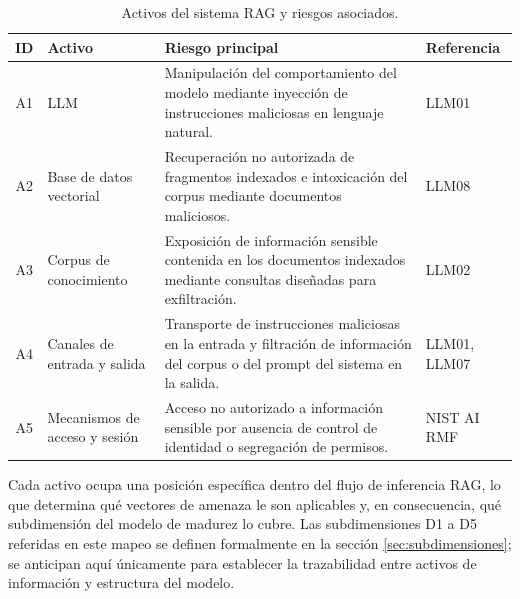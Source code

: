 \begin{table}[H]
\centering
\caption{Activos del sistema RAG y riesgos asociados.}
\label{tab:activos}
\begin{tabularx}{\textwidth}{@{} c >{\hsize=0.85\hsize\raggedright\arraybackslash}X >{\hsize=1.45\hsize\raggedright\arraybackslash}X >{\hsize=0.70\hsize\raggedright\arraybackslash}X @{}}
  \toprule
  \textbf{ID} & \textbf{Activo} & \textbf{Riesgo principal} & \textbf{Referencia} \\
  \midrule
  A1 & LLM &
    Manipulación del comportamiento del modelo mediante inyección de instrucciones maliciosas en lenguaje natural. &
    LLM01 \\
  A2 & Base de datos vectorial &
    Recuperación no autorizada de fragmentos indexados e intoxicación del corpus mediante documentos maliciosos. &
    LLM08 \\
  A3 & Corpus de conocimiento &
    Exposición de información sensible contenida en los documentos indexados mediante consultas diseñadas para exfiltración. &
    LLM02 \\
  A4 & Canales de entrada y salida &
    Transporte de instrucciones maliciosas en la entrada y filtración de información del corpus o del prompt del sistema en la salida. &
    LLM01, LLM07 \\
  A5 & Mecanismos de acceso y sesión &
    Acceso no autorizado a información sensible por ausencia de control de identidad o segregación de permisos. &
    NIST AI RMF \cite{nistairmf} \\
  \bottomrule
\end{tabularx}
\end{table}

Cada activo ocupa una posición específica dentro del flujo de inferencia RAG, lo que determina qué vectores de amenaza le son aplicables y, en consecuencia, qué subdimensión del modelo de madurez lo cubre. Las subdimensiones D1 a D5 referidas en este mapeo se definen formalmente en la sección \ref{sec:subdimensiones}; se anticipan aquí únicamente para establecer la trazabilidad entre activos de información y estructura del modelo.

